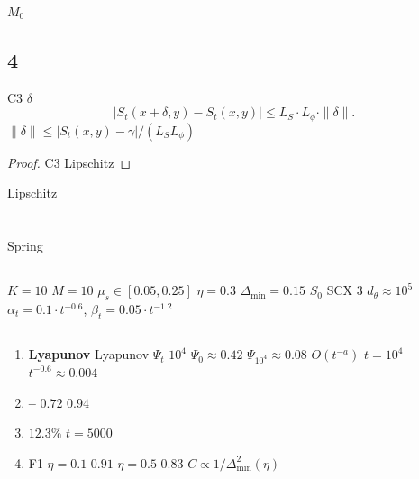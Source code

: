 \textbf{}  $M_0$

\subsection{ 4}

\begin{proposition}[Lipschitz ]\label{prop:robust-cert}
 C3  $\delta$
\begin{equation}
    |S_t(x + \delta, y) - S_t(x, y)| \leq L_S \cdot L_\phi \cdot \|\delta\|.
\end{equation}
 $\|\delta\| \leq |S_t(x,y) - \gamma|/(L_S L_\phi)$ 
\end{proposition}

\begin{proof}
 C3  Lipschitz 
\end{proof}

\textbf{} Lipschitz 

\section{}

 Spring

\subsection{}

$K = 10$ $M = 10$  $\mu_s \in [0.05, 0.25]$ $\eta = 0.3$ $\Delta_{\min} = 0.15$ $S_0$  SCX  3 $d_\theta \approx 10^5$  $\alpha_t = 0.1 \cdot t^{-0.6}$, $\beta_t = 0.05 \cdot t^{-1.2}$

\subsection{}



\begin{enumerate}[nosep]
    \item \textbf{Lyapunov } Lyapunov  $\Psi_t$  $10^4$  $\Psi_0 \approx 0.42$  $\Psi_{10^4} \approx 0.08$ $O(t^{-a})$  $t = 10^4$  $t^{-0.6} \approx 0.004$
    \item \textbf{--}  $0.72$  $0.94$
    \item \textbf{} $12.3\%$  $t = 5000$ 
    \item \textbf{}  F1  $\eta = 0.1$  $0.91$  $\eta = 0.5$  $0.83$ $C \propto 1/\Delta_{\min}^2(\eta)$ 
\end{enumerate}

